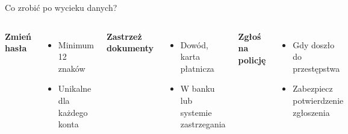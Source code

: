 \begin{frame}{Co zrobić po wycieku danych?}
\begin{columns}[t]
    \textbf{Zmień hasła}
    \begin{itemize}
        \item Minimum 12 znaków
        \item Unikalne dla każdego konta
    \end{itemize}
    \vspace{0.5em}
    \textbf{Zastrzeż dokumenty}
    \begin{itemize}
        \item Dowód, karta płatnicza
        \item W banku lub systemie zastrzegania
    \end{itemize}
    \textbf{Zgłoś na policję}
    \begin{itemize}
        \item Gdy doszło do przestępstwa
        \item Zabezpiecz potwierdzenie zgłoszenia \cite{WYCIEK}
    \end{itemize}
\end{columns}
\end{frame}